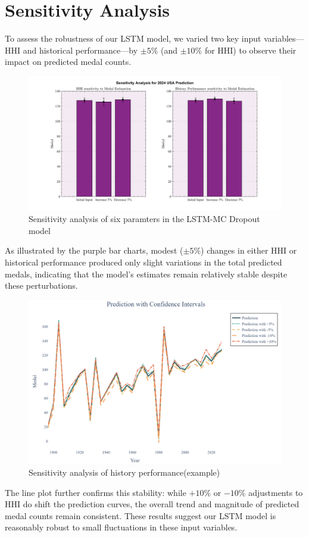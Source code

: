 \documentclass{mcmthesis}
\begin{document}
	
	
\section{Sensitivity Analysis}
To assess the robustness of our LSTM model, we varied two key input variables—HHI and historical performance—by $\pm5\%$ (and $\pm10\%$ for HHI) to observe their impact on predicted medal counts. 

	\begin{figure}[H]
	\centering
	\includegraphics[width=0.8\linewidth]{fig/barplot.png}
	\caption{Sensitivity analysis of six paramters in the LSTM-MC Dropout model}
	\label{barplot}
	\end{figure}
As illustrated by the purple bar charts, modest ($\pm5\%$) changes in either HHI or historical performance produced only slight variations in the total predicted medals, indicating that the model’s estimates remain relatively stable despite these perturbations. 

	\begin{figure}[H]
	\centering
	\includegraphics[width=\linewidth]{fig/lineplot.png}
	\caption{Sensitivity analysis of history performance(example)}
	\label{lineplot}
\end{figure}
The line plot further confirms this stability: while $+10\%$ or $-10\%$ adjustments to HHI do shift the prediction curves, the overall trend and magnitude of predicted medal counts remain consistent. These results suggest our LSTM model is reasonably robust to small fluctuations in these input variables.
	
\end{document}
